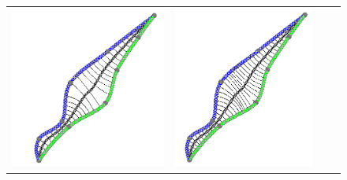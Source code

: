 \documentclass[journal, letterpaper]{IEEEtran}
\begin{document}
\begin{figure} %
	\centering
		\begin{tabular}{cccc}
			\includegraphics[scale=0.4]{images/NoGeodesicSampling.png} & \includegraphics[scale=0.4]{images/GeodesicSampling.png} 

\end{tabular}
\end{figure}
\end{document}
